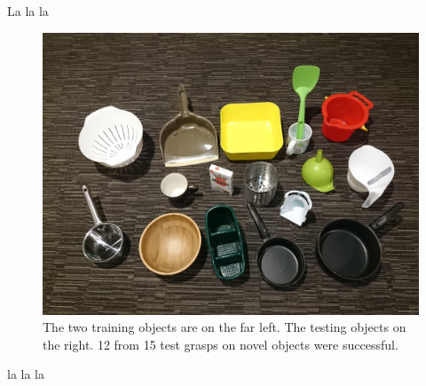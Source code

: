 La la la

\begin{figure}
 \includegraphics[width=0.9\linewidth]{images/object_set}
 \caption{The two training objects are on the far left. The testing objects on the right. 12 from 15 test grasps on novel objects were successful.}
 \label{fig:test}
\end{figure}

la la la